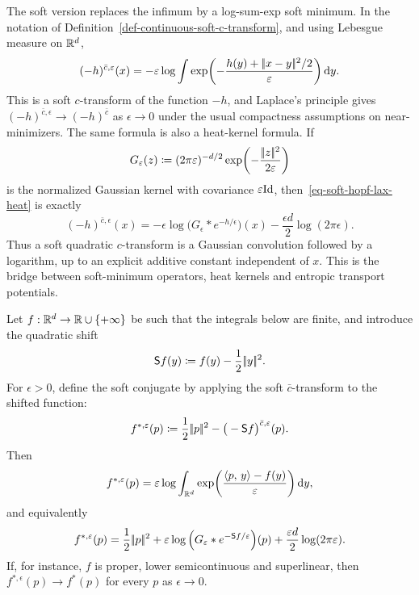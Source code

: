 The soft version replaces the infimum by a log-sum-exp soft minimum. In the notation of Definition~\ref{def-continuous-soft-c-transform}, and using Lebesgue measure on $\mathbb{R}^d$,
\begin{equation}\label{eq-soft-hopf-lax-heat}
	(-h)^{\bar c,\varepsilon}(x)
	=
	-\varepsilon\log
	\int
	\exp\!\left(
	-\frac{h(y)+|\!| x-y |\!|^2/2}{\varepsilon}
	\right)\mathrm{d} y .
	\end{equation}
This is a soft $c$-transform of the function $-h$, and Laplace's principle gives $(-h)^{\bar c,\epsilon}\to(-h)^{\bar c}$ as $\epsilon\to0$ under the usual compactness assumptions on near-minimizers. The same formula is also a heat-kernel formula. If
\[
	G_\varepsilon(z)\coloneqq (2\pi\varepsilon)^{-d/2}\exp\!\left(-\frac{|\!| z |\!|^2}{2\varepsilon}\right)
\]
is the normalized Gaussian kernel with covariance $\varepsilon\mathrm{Id}$, then~\eqref{eq-soft-hopf-lax-heat} is exactly
\begin{equation}\label{eq-soft-c-transform-gaussian-convolution}
	(-h)^{\bar c,\epsilon}(x)
	=
	-\epsilon\log\Big(G_\epsilon\ast e^{-h/\epsilon}\Big)(x)
	-\frac{\epsilon d}{2}\log(2\pi\epsilon).
\end{equation}
Thus a soft quadratic $c$-transform is a Gaussian convolution followed by a logarithm, up to an explicit additive constant independent of $x$. This is the bridge between soft-minimum operators, heat kernels and entropic transport potentials.

\begin{prop}\label{prop-soft-legendre-convolution}
Let $f:\mathbb{R}^d\to\mathbb{R}\cup\{+\infty\}$ be such that the integrals below are finite, and introduce the quadratic shift
\[
	\mathsf S f(y)\coloneqq f(y)-\frac12|\!| y |\!|^2.
\]
For $\epsilon>0$, define the soft conjugate by applying the soft $\bar c$-transform to the shifted function:
\begin{equation}\label{eq-soft-legendre-definition}
	f^{*,\varepsilon}(p)
	\coloneqq
	\frac12|\!| p |\!|^2-\big(-\mathsf S f\big)^{\bar c,\varepsilon}(p).
\end{equation}
Then
\begin{equation}\label{eq-soft-legendre-logsumexp}
	f^{*,\varepsilon}(p)
	=
	\varepsilon\log\int_{\mathbb{R}^d}
	\exp\!\left(\frac{\langle p,\,y\rangle-f(y)}{\varepsilon}\right)\mathrm{d} y,
\end{equation}
and equivalently
\begin{equation}\label{eq-soft-legendre-convolution}
	f^{*,\varepsilon}(p)
	=
	\frac12|\!| p |\!|^2
	+\varepsilon\log\Big(G_\varepsilon\ast e^{-\mathsf S f/\varepsilon}\Big)(p)
	+\frac{\varepsilon d}{2}\log(2\pi\varepsilon).
\end{equation}
If, for instance, $f$ is proper, lower semicontinuous and superlinear, then $f^{*,\epsilon}(p)\to f^*(p)$ for every $p$ as $\epsilon\to0$.
\end{prop}

